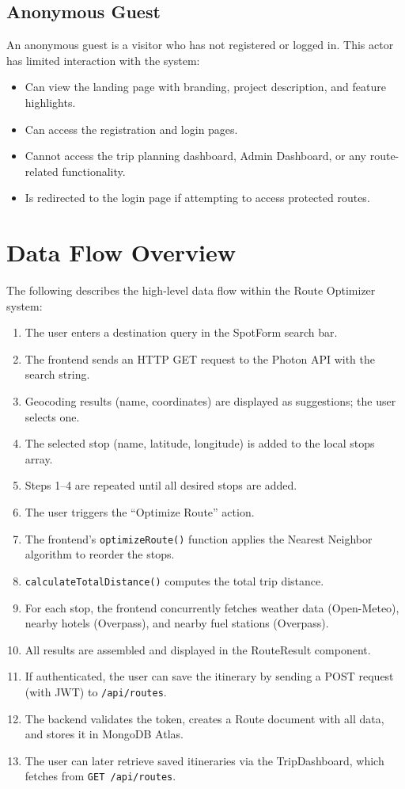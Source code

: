 \subsection{Anonymous Guest}
An anonymous guest is a visitor who has not registered or logged in. This actor has limited interaction with the system:
\begin{itemize}
    \item Can view the landing page with branding, project description, and feature highlights.
    \item Can access the registration and login pages.
    \item Cannot access the trip planning dashboard, Admin Dashboard, or any route-related functionality.
    \item Is redirected to the login page if attempting to access protected routes.
\end{itemize}

\section{Data Flow Overview}
The following describes the high-level data flow within the Route Optimizer system:
\begin{enumerate}
    \item The user enters a destination query in the SpotForm search bar.
    \item The frontend sends an HTTP GET request to the Photon API with the search string.
    \item Geocoding results (name, coordinates) are displayed as suggestions; the user selects one.
    \item The selected stop (name, latitude, longitude) is added to the local stops array.
    \item Steps 1--4 are repeated until all desired stops are added.
    \item The user triggers the ``Optimize Route'' action.
    \item The frontend's \texttt{optimizeRoute()} function applies the Nearest Neighbor algorithm to reorder the stops.
    \item \texttt{calculateTotalDistance()} computes the total trip distance.
    \item For each stop, the frontend concurrently fetches weather data (Open-Meteo), nearby hotels (Overpass), and nearby fuel stations (Overpass).
    \item All results are assembled and displayed in the RouteResult component.
    \item If authenticated, the user can save the itinerary by sending a POST request (with JWT) to \texttt{/api/routes}.
    \item The backend validates the token, creates a Route document with all data, and stores it in MongoDB Atlas.
    \item The user can later retrieve saved itineraries via the TripDashboard, which fetches from \texttt{GET /api/routes}.
\end{enumerate}